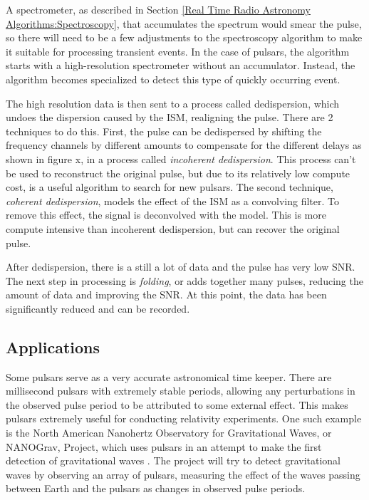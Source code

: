 A spectrometer, as described in Section \ref{Real Time Radio Astronomy Algorithms:Spectroscopy}, that accumulates the spectrum would smear the pulse, so there will need to be a few adjustments to the spectroscopy algorithm to make it suitable for processing transient events. 
In the case of pulsars, the algorithm starts with a high-resolution spectrometer without an accumulator. 
Instead, the algorithm becomes specialized to detect this type of quickly occurring event.

The high resolution data is then sent to a process called dedispersion, which undoes the dispersion caused by the ISM, realigning the pulse.
There are 2 techniques to do this.
First, the pulse can be dedispersed by shifting the frequency channels by different amounts to compensate for the different delays as shown in figure x, in a process called \emph{incoherent dedispersion}. %
This process can't be used to reconstruct the original pulse, but due to its relatively low compute cost, is a useful algorithm to search for new pulsars.
The second technique, \emph{coherent dedispersion}, models the effect of the ISM as a convolving filter. 
To remove this effect, the signal is deconvolved with the model.
This is more compute intensive than incoherent dedispersion, but can recover the original pulse.

After dedispersion, there is a still a lot of data and the pulse has very low SNR. 
The next step in processing is \emph{folding}, or adds together many pulses, reducing the amount of data and improving the SNR.
At this point, the data has been significantly reduced and can be recorded. 



%
\subsection{Applications}
Some pulsars serve as a very accurate astronomical time keeper.
There are millisecond pulsars with extremely stable periods, allowing any perturbations in the observed pulse period to be attributed to some external effect.
This makes pulsars extremely useful for conducting relativity experiments. 
One such example is the North American Nanohertz Observatory for Gravitational Waves, or NANOGrav, Project, %
which uses pulsars in an attempt to make the first detection of gravitational waves \cite{2009astro2010S..64D}. 
The project will try to detect gravitational waves by observing an array of pulsars, measuring the effect of the waves passing between Earth and the pulsars as changes in observed pulse periods.

